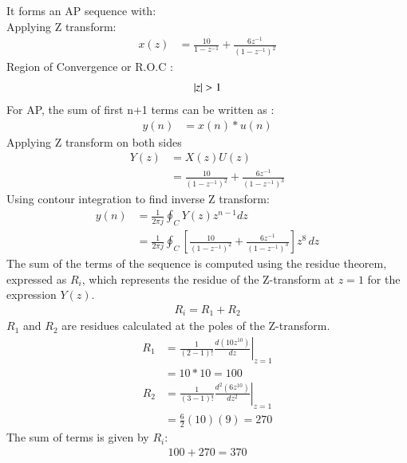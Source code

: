 \documentclass[journal,12pt,twocolumn]{IEEEtran}
\theoremstyle{remark}
\begin{document}
It forms an AP sequence with:\\
  
Applying Z transform:
\begin{align}
    x(z) &=\frac{10}{1-z^{-1}} + \frac{6z^{-1}}{(1-z^{-1})^2}
\end{align}
     Region of Convergence or R.O.C :
\begin{align}
     \left\vert z\right\vert>1
\end{align}
For AP, the sum of first n+1 terms can be written as :
\begin{align}
	 y(n)&=x(n)*u(n)
\end{align}  
Applying Z transform on both sides
\begin{align}
	Y(z) &= X(z)U(z)\\
	&=\frac{10}{(1-z^{-1})^2} + \frac{6z^{-1}}{(1-z^{-1})^3}
\end{align}
Using contour integration to find inverse Z transform:
\begin{align}
	y(n) &= \frac{1}{2\pi j} \oint_C Y(z) z^{n-1} dz\\
	&= \frac{1}{2\pi j} \oint_C \left[ \frac{10}{(1-z^{-1})^2} + \frac{6z^{-1}}{(1-z^{-1})^3} \right]z^{8} \, dz
\end{align}
The sum of the terms of the sequence is computed using the residue theorem, expressed as $R_i$, which represents the residue of the Z-transform at $ z=1 $ for the expression $ Y(z) $.
\begin{align}
	R_i=R_1 + R_2
\end{align}
 $R_1$ and $R_2$ are residues calculated at the poles of the Z-transform.
\begin{align}
		R_1 &= \frac{1}{{(2-1)!}} \left. \frac{d (10z^{10})}{dz} \right|_{z=1} \\
	&=10*10=100
\end{align}
\begin{align}
	R_2 &= \frac{1}{{(3-1)!}} \left. \frac{d^2(6z^{10})}{dz^2} \right|_{z=1} \\
	&= \frac{6}{2}(10)(9) = 270
\end{align}
The sum of terms is given by $R_i$:
 \begin{align}
100 + 270 = 370
\end{align}
\end{document}
